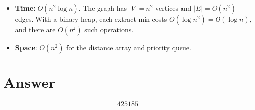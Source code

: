 \documentclass[12pt]{article}
\begin{document}
\begin{itemize}
    \item \textbf{Time:} $O(n^2 \log n)$. The graph has $|V| = n^2$ vertices and $|E| = O(n^2)$ edges. With a binary heap, each extract-min costs $O(\log n^2) = O(\log n)$, and there are $O(n^2)$ such operations.
    \item \textbf{Space:} $O(n^2)$ for the distance array and priority queue.
\end{itemize}

\section{Answer}

\[
\boxed{425185}
\]
\end{document}
